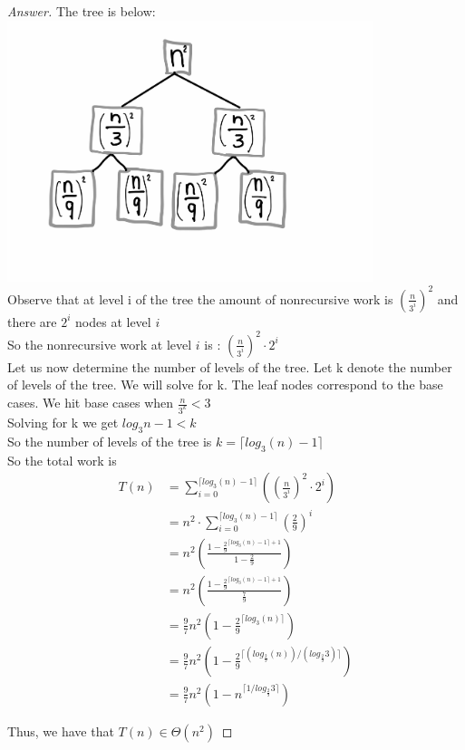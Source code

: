 \documentclass[11pt]{article}
\theoremstyle{definition}
\theoremstyle{definition}
\theoremstyle{definition}
\begin{document}
\begin{proof}[Answer]
The tree is below: \\
\includegraphics[width=0.8\textwidth]{Hw5Q3} \\
Observe that at level i of the tree the amount of nonrecursive work is $(\frac{n}{3^i})^2$ and there are $2^i$ nodes at level $i$ \\
So the nonrecursive work at level $i$ is : $(\frac{n}{3^i})^2\cdot 2^i$ \\

Let us now determine the number of levels of the tree. Let k denote the number of levels of the tree. We will solve for k. The leaf nodes correspond to the base cases. 
We hit base cases when $\frac{n}{3^k} < 3$ \\ 
Solving for k we get $log_3n-1 < k$ \\
So the number of levels of the tree is $k = \lceil log_3(n)-1\rceil$ \\

So the total work is \\
\begin{align*}
T(n) &= \sum_{i=0}^{\lceil log_3(n)-1\rceil}((\frac{n}{3^i})^2\cdot2^i)\\
&=n^2\cdot \sum_{i=0}^{\lceil log_3(n)-1\rceil}(\frac{2}{9})^i\\
&=n^2( \frac{1-\frac{2}{9}^{\lceil log_3(n)-1\rceil+1}}{1-\frac{2}{9}})\\
&=n^2( \frac{1-\frac{2}{9}^{\lceil log_3(n)-1\rceil +1}}{\frac{7}{9}})\\
&=\frac{9}{7}n^2( {1-\frac{2}{9}}^{\lceil log_3(n)\rceil})\\
&=\frac{9}{7}n^2(1-\frac{2}{9}^{\lceil (log_{\frac{2}{9}}(n))/(log_{\frac{2}{9}}3)\rceil})\\
&=\frac{9}{7}n^2(1-n^{\lceil 1/log_{\frac{2}{9}}3\rceil})
\end{align*}

Thus, we have that $T(n) \in \Theta(n^2)$
\end{proof}
\end{document}
